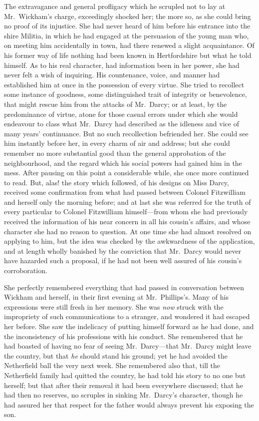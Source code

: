 The extravagance and general profligacy which he scrupled not
to lay at Mr.\ Wickham's charge, exceedingly shocked her; the
more so, as she could bring no proof of its injustice.  She had
never heard of him before his entrance into the \gdash{}shire Militia,
in which he had engaged at the persuasion of the young man
who, on meeting him accidentally in town, had there renewed a
slight acquaintance.  Of his former way of life nothing had been
known in Hertfordshire but what he told himself.  As to his real
character, had information been in her power, she had never felt
a wish of inquiring.  His countenance, voice, and manner had
established him at once in the possession of every virtue.  She
tried to recollect some instance of goodness, some distinguished
trait of integrity or benevolence, that might rescue him from the
attacks of Mr.\ Darcy; or at least, by the predominance of virtue,
atone for those casual errors under which she would endeavour
to class what Mr.\ Darcy had described as the idleness and vice
of many years' continuance.  But no such recollection befriended
her.  She could see him instantly before her, in every charm of
air and address; but she could remember no more substantial
good than the general approbation of the neighbourhood, and
the regard which his social powers had gained him in the mess.
After pausing on this point a considerable while, she once more
continued to read.  But, alas! the story which followed, of his
designs on Miss Darcy, received some confirmation from what
had passed between Colonel Fitzwilliam and herself only the
morning before; and at last she was referred for the truth of
every particular to Colonel Fitzwilliam himself---from whom she
had previously received the information of his near concern in
all his cousin's affairs, and whose character she had no reason
to question.  At one time she had almost resolved on applying
to him, but the idea was checked by the awkwardness of the
application, and at length wholly banished by the conviction
that Mr.\ Darcy would never have hazarded such a proposal, if
he had not been well assured of his cousin's corroboration.

She perfectly remembered everything that had passed in
conversation between Wickham and herself, in their first evening
at Mr.\ Phillips's.  Many of his expressions were still fresh in
her memory.  She was \emph{now} struck with the impropriety of such
communications to a stranger, and wondered it had escaped her
before.  She saw the indelicacy of putting himself forward as
he had done, and the inconsistency of his professions with his
conduct.  She remembered that he had boasted of having no fear
of seeing Mr.\ Darcy---that Mr.\ Darcy might leave the country,
but that \emph{he} should stand his ground; yet he had avoided the
Netherfield ball the very next week.  She remembered also that,
till the Netherfield family had quitted the country, he had told
his story to no one but herself; but that after their removal it
had been everywhere discussed; that he had then no reserves, no
scruples in sinking Mr.\ Darcy's character, though he had assured
her that respect for the father would always prevent his exposing
the son.

